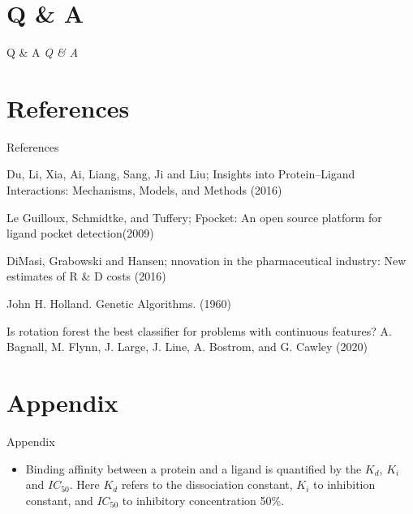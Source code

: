 \documentclass{beamer}
\begin{document}
\section{Q \& A}

\begin{frame}[t]{Q \& A}
  \centering \Huge
  \emph{Q \& A}
\end{frame}

\section{References}

\begin{frame}[t]{References}

\begin{thebibliography}{1}

\alert{Du,  Li,  Xia,  Ai,  Liang,  Sang,  Ji and Liu; Insights into Protein–Ligand Interactions: Mechanisms, Models, and Methods (2016)}

\alert{Le Guilloux,  Schmidtke, and Tuffery; Fpocket: An open source platform for ligand pocket detection(2009)}

\alert{DiMasi,  Grabowski and Hansen; nnovation in the pharmaceutical industry: New estimates of R \& D costs (2016)}

\alert{John H. Holland.  Genetic Algorithms. (1960)}

\alert{Is rotation forest the best classifier for problems with continuous features? A. Bagnall, M. Flynn, J. Large, J. Line, A. Bostrom, and G. Cawley (2020)}

\end{thebibliography}

\end{frame}

\section{Appendix}

\begin{frame}[t]{Appendix}

\begin{itemize}
\item Binding affinity between a protein and a ligand is quantified by the $K_d$, $K_i$ and $IC_{50}$.
Here $K_d$ refers to the dissociation constant, $K_i$ to inhibition constant, and $IC_{50}$ to 
inhibitory concentration 50\%.
\end{itemize}
\end{frame}
\end{document}
